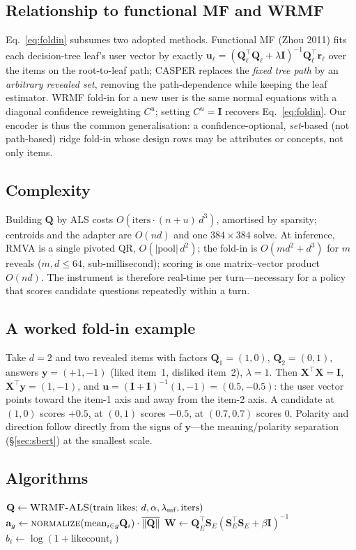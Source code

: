 \documentclass[11pt]{article}
\newcommand{\Q}{\mathbf{Q}}
\newcommand{\X}{\mathbf{X}}
\newcommand{\uu}{\mathbf{u}}
\newcommand{\yy}{\mathbf{y}}
\newcommand{\W}{\mathbf{W}}
\newcommand{\I}{\mathbf{I}}
\begin{document}
\subsection{Relationship to functional MF and WRMF}
Eq.~\eqref{eq:foldin} subsumes two adopted methods. Functional MF (Zhou 2011) fits each decision-tree leaf's user
vector by exactly $\uu_\ell=(\Q_\ell^\top\Q_\ell+\lambda\I)^{-1}\Q_\ell^\top\mathbf r_\ell$ over the items on the
root-to-leaf path; CASPER replaces the \emph{fixed tree path} by an \emph{arbitrary revealed set}, removing the
path-dependence while keeping the leaf estimator. WRMF fold-in for a new user is the same normal equations with a
diagonal confidence reweighting $C^u$; setting $C^u=\I$ recovers Eq.~\eqref{eq:foldin}. Our encoder is thus the
common generalisation: a confidence-optional, \emph{set}-based (not path-based) ridge fold-in whose design rows may
be attributes or concepts, not only items.

\subsection{Complexity}
Building $\Q$ by ALS costs $O(\text{iters}\cdot(n{+}u)\,d^3)$, amortised by sparsity; centroids and the adapter are
$O(nd)$ and one $384{\times}384$ solve. At inference, RMVA is a single pivoted QR, $O(|\text{pool}|\,d^2)$; the
fold-in is $O(md^2+d^3)$ for $m$ reveals ($m,d\le 64$, sub-millisecond); scoring is one matrix--vector product
$O(nd)$. The instrument is therefore real-time per turn---necessary for a policy that scores candidate questions
repeatedly within a turn.

\subsection{A worked fold-in example}
Take $d{=}2$ and two revealed items with factors $\Q_1{=}(1,0)$, $\Q_2{=}(0,1)$, answers $\yy{=}(+1,-1)$ (liked
item~1, disliked item~2), $\lambda{=}1$. Then $\X^\top\X=\I$, $\X^\top\yy=(1,-1)$, and
$\uu=(\I+\I)^{-1}(1,-1)=(0.5,-0.5)$: the user vector points toward the item-1 axis and away from the item-2 axis.
A candidate at $(1,0)$ scores $+0.5$, at $(0,1)$ scores $-0.5$, at $(0.7,0.7)$ scores $0$. Polarity and direction
follow directly from the signs of $\yy$---the meaning/polarity separation (\S\ref{sec:sbert}) at the smallest
scale.

\subsection{Algorithms}
\begin{algorithm}[h]\small
\caption{Build the instrument (offline)}
\begin{algorithmic}[1]
\State $\Q \gets \textsc{WRMF-ALS}(\text{train likes};\,d,\alpha,\lambda_{\mathrm{mf}},\text{iters})$
 $\mathbf a_g \gets \textsc{normalize}(\text{mean}_{i\in g}\Q_i)\cdot\overline{\lVert\Q\rVert}$ \EndFor
\State $\W \gets \Q_E^\top \mathbf S_E(\mathbf S_E^\top \mathbf S_E+\beta\I)^{-1}$ 
\State $b_i \gets \log(1+\text{likecount}_i)$
\end{algorithmic}
\end{algorithm}
\end{document}
